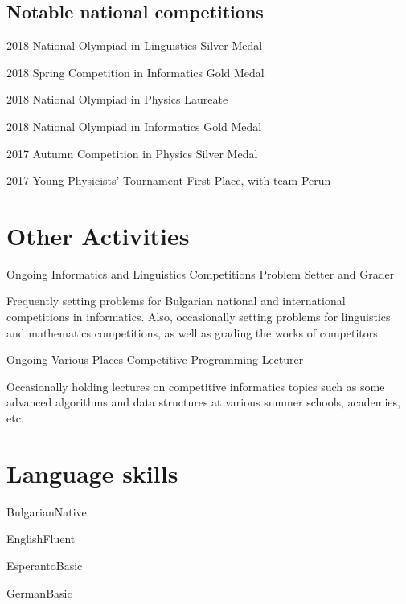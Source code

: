 \documentclass{tccv}
\begin{document}
\subsection{Notable national competitions}

\begin{yearlist}

\item{2018}
     {National Olympiad in Linguistics}
     {Silver Medal}

\item{2018}
     {Spring Competition in  Informatics}
     {Gold Medal}

\item{2018}
     {National Olympiad in Physics}
     {Laureate}

\item{2018}
     {National Olympiad in Informatics}
     {Gold Medal}

\item{2017}
     {Autumn Competition in Physics}
     {Silver Medal}

\item{2017}
     {Young Physicists' Tournament}
     {First Place, with team Perun}

\end{yearlist}

\newpage

\section{Other Activities}

\begin{eventlist}

\item{Ongoing}
     {Informatics and Linguistics Competitions}
     {Problem Setter and Grader}

Frequently setting problems for Bulgarian national and international competitions in informatics. Also, occasionally setting problems for linguistics and mathematics competitions, as well as grading the works of competitors.

\item{Ongoing}
     {Various Places}
     {Competitive Programming Lecturer}

Occasionally holding lectures on competitive informatics topics such as some advanced algorithms and data structures at various summer schools, academies, etc.

\end{eventlist}

\section{Language skills}

\begin{factlist}

\item{Bulgarian}{Native}
\item{English}{Fluent}
\item{Esperanto}{Basic}
\item{German}{Basic}

\end{factlist}
\end{document}
